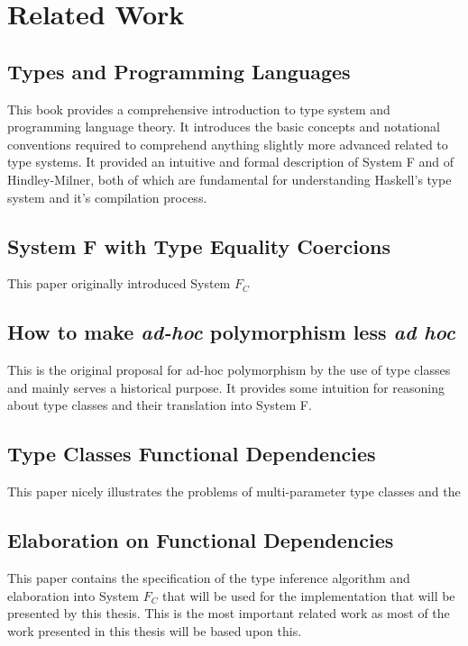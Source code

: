\section{Related Work}
\subsection{Types and Programming Languages\cite{pierce2002types}}
This book provides a comprehensive introduction to type system and programming
language theory. It introduces the basic concepts and notational conventions
required to comprehend anything slightly more advanced related to type systems.
It provided an intuitive and formal description of System F and of
Hindley-Milner, both of which are fundamental for understanding Haskell's type
system and it's compilation process.
\subsection{System F with Type Equality
Coercions\cite{Sulzmann:2007:SFT:1190315.1190324}}

This paper originally introduced System $F_C$

\subsection{How to make \textit{ad-hoc} polymorphism less \textit{ad
hoc}\cite{Wadler:1989:MAP:75277.75283}}

This is the original proposal for ad-hoc polymorphism by the use of type classes
and mainly serves a historical purpose. It provides some intuition for reasoning
about type classes and their translation into System F.

\subsection{Type Classes Functional Dependencies\cite{Jones00typeclasses}}
This paper nicely illustrates the problems of multi-parameter type classes and
the 
\subsection{Elaboration on Functional
Dependencies\cite{Karachalias:2017:EFD:3156695.3122966}}

This paper contains the specification of the type inference algorithm and
elaboration into System $F_C$ that will be used for the implementation that will
be presented by this thesis. This is the most important related work as most of
the work presented in this thesis will be based upon this.

